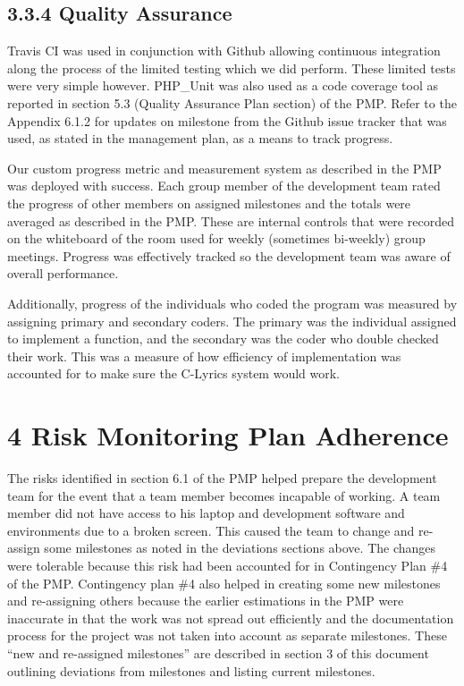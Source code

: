 \documentclass[]{article}
\begin{document}
\subsection{\textbf{3.3.4 Quality Assurance}}\label{quality-assurance}

Travis CI was used in conjunction with Github allowing continuous
integration along the process of the limited testing which we did
perform. These limited tests were very simple however. PHP\_Unit was
also used as a code coverage tool as reported in section 5.3 (Quality
Assurance Plan section) of the PMP. Refer to the Appendix 6.1.2 for
updates on milestone from the Github issue tracker that was used, as
stated in the management plan, as a means to track progress.

Our custom progress metric and measurement system as described in the
PMP was deployed with success. Each group member of the development team
rated the progress of other members on assigned milestones and the
totals were averaged as described in the PMP. These are internal
controls that were recorded on the whiteboard of the room used for
weekly (sometimes bi-weekly) group meetings. Progress was effectively
tracked so the development team was aware of overall performance.

Additionally, progress of the individuals who coded the program was
measured by assigning primary and secondary coders. The primary was the
individual assigned to implement a function, and the secondary was the
coder who double checked their work. This was a measure of how
efficiency of implementation was accounted for to make sure the C-Lyrics
system would work.

\section{\textbf{4 Risk Monitoring Plan
Adherence}}\label{risk-monitoring-plan-adherence}

The risks identified in section 6.1 of the PMP helped prepare the
development team for the event that a team member becomes incapable of
working. A team member did not have access to his laptop and development
software and environments due to a broken screen. This caused the team
to change and re-assign some milestones as noted in the deviations
sections above. The changes were tolerable because this risk had been
accounted for in Contingency Plan \#4 of the PMP. Contingency plan \#4
also helped in creating some new milestones and re-assigning others
because the earlier estimations in the PMP were inaccurate in that the
work was not spread out efficiently and the documentation process for
the project was not taken into account as separate milestones. These
``new and re-assigned milestones'' are described in section 3 of this
document outlining deviations from milestones and listing current
milestones.
\end{document}
